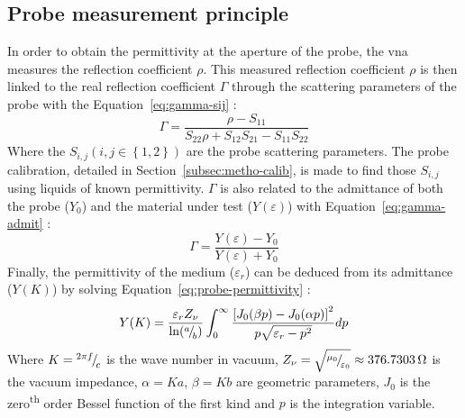 \subsection{Probe measurement principle}\label{metho:probe-princip}
In order to obtain the permittivity at the aperture of the probe, the \ac{vna} measures the reflection coefficient \(\rho\).
This measured reflection coefficient \(\rho\) is then linked to the real reflection coefficient \(\Gamma\) through the scattering parameters of the probe with the Equation~\ref{eq:gamma-sij} \parencite{Nyshadham1992}:
%
\begin{equation}\label{eq:gamma-sij}
    \Gamma = \frac{\rho-S_{11}}{S_{22}\rho+S_{12}S_{21}-S_{11}S_{22}}
\end{equation}
%
Where the \(S_{i,j} \left(i,j \in \left\{1,2\right\}\right)\) are the probe scattering parameters.
The probe calibration, detailed in Section~\ref{subsec:metho-calib}, is made to find those \(S_{i,j}\) using liquids of known permittivity.
\(\Gamma\) is also related to the admittance of both the probe (\(Y_0\)) and the material under test (\(Y(\varepsilon)\)) with Equation~\ref{eq:gamma-admit} \parencite{Nyshadham1992}:
%
\begin{equation}\label{eq:gamma-admit}
    \Gamma = \frac{Y(\varepsilon) - Y_0}{Y(\varepsilon) + Y_0}
\end{equation}
%
Finally, the permittivity of the medium (\(\varepsilon_r\)) can be deduced from its admittance (\(Y(K)\)) by solving Equation~\ref{eq:probe-permittivity} \parencite{Galejs1969a}:
%
\begin{equation}\label{eq:probe-permittivity}
    Y(K) = \frac{\varepsilon_r Z_\nu}{\ln(\sidefrac{a}{b})} 
    \int_{0}^{\infty}
    \frac{{\left[J_0(\beta p)-J_0(\alpha p)\right]}^2} %
         {p\sqrt{\varepsilon_r - p^2}}dp
\end{equation}
%
Where \(K={}^{2\pi f}{\mskip-3mu/\mskip-3mu}_{c}\) is the wave number in vacuum, \(Z_\nu=\sqrt{{}^{\mu_{0}}{\mskip-3mu/\mskip-3mu}_{\varepsilon_{0}}}\approx \qty{376.7303}{\ohm}\) is the vacuum impedance, \(\alpha = Ka\), \(\beta = Kb\) are geometric parameters, \(J_{0}\) is the zero\textsuperscript{th} order Bessel function of the first kind and \(p\) is the integration variable.  %

